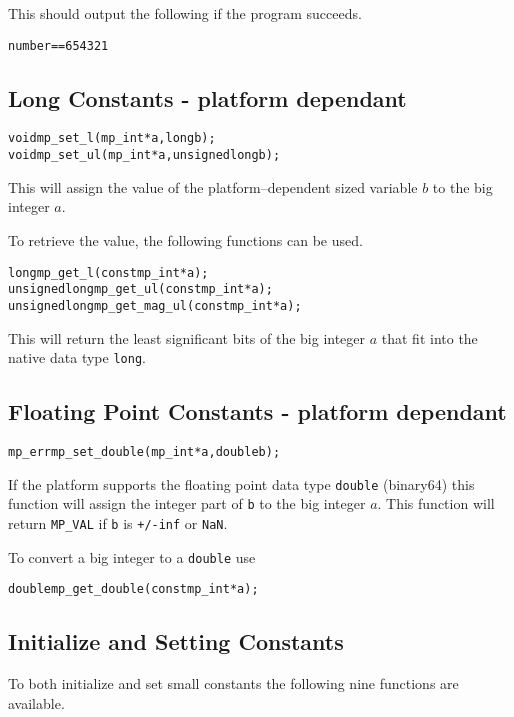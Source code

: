 \documentclass[synpaper]{book}
\begin{document}
This should output the following if the program succeeds.

\begin{alltt}
number == 654321
\end{alltt}

\subsection{Long Constants - platform dependant}

 
\begin{alltt}
void mp_set_l (mp_int *a, long b);
void mp_set_ul (mp_int *a, unsigned long b);
\end{alltt}

This will assign the value of the platform--dependent sized variable $b$ to the big integer $a$.

To retrieve the value, the following functions can be used.

  
\begin{alltt}
long mp_get_l (const mp_int *a);
unsigned long mp_get_ul (const mp_int *a);
unsigned long mp_get_mag_ul (const mp_int *a);
\end{alltt}

This will return the least significant bits of the big integer $a$ that fit into the native data
type \texttt{long}.

\subsection{Floating Point Constants - platform dependant}

\begin{alltt}
mp_err mp_set_double(mp_int *a, double b);
\end{alltt}

If the platform supports the floating point data type \texttt{double} (binary64) this function will
assign the integer part of \texttt{b} to the big integer $a$. This function will return
\texttt{MP\_VAL} if \texttt{b} is \texttt{+/-inf} or \texttt{NaN}.

To convert a big integer to a \texttt{double} use

\begin{alltt}
double mp_get_double(const mp_int *a);
\end{alltt}

\subsection{Initialize and Setting Constants}
To both initialize and set small constants the following nine functions are available.
\end{document}
